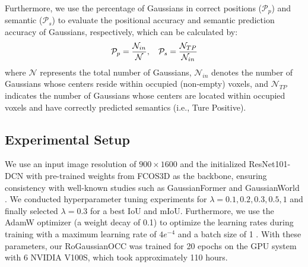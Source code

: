 \documentclass[journal]{IEEEtran}
\begin{document}
Furthermore, we use the percentage of Gaussians in correct positions ({\small $\mathcal{P}_{p}$}) and semantic \cite{gaussianformer2} ({\small $\mathcal{P}_{s}$}) to evaluate the positional accuracy and semantic prediction accuracy of Gaussians, respectively, which can be calculated by: 
\begin{equation} \small
\mathcal{P}_{p}= \frac{\mathcal{N}_{in}}{\mathcal{N}}, \quad\space \mathcal{P}_{s}= \frac{\mathcal{N}_{TP}}{\mathcal{N}_{in}}
\end{equation}
where {\small $\mathcal{N}$} represents the total number of Gaussians, {\small $\mathcal{N}_{in}$} denotes the number of Gaussians whose centers reside within occupied (non-empty) voxels, and {\small $\mathcal{N}_{TP}$} indicates the number of Gaussians whose centers are located within occupied voxels and have correctly predicted semantics (i.e., Ture Positive). 

\subsection{Experimental Setup}

We use an input image resolution of $900 \times 1600$ and the initialized ResNet101-DCN \cite{he2016deep} with pre-trained weights from FCOS3D \cite{fcos3d} as the backbone, ensuring consistency with well-known studies such as GaussianFormer \cite{huang2024gaussianformer} and GaussianWorld \cite{zuo2024gaussianworld}. 
We conducted hyperparameter tuning experiments for $\lambda = {0.1, 0.2, 0.3, 0.5, 1}$ and finally selected $\lambda = 0.3$ for a best IoU and mIoU.
Furthermore, we use the AdamW optimizer (a weight decay of 0.1) to optimize the learning rates during training with a maximum learning rate of $4e^{-4}$ and a batch size of 1 \cite{loshchilov2017decoupled}. 
With these parameters, our RoGaussianOCC was trained for 20 epochs on the GPU system with 6 NVIDIA V100S, which took approximately 110 hours.
\end{document}
